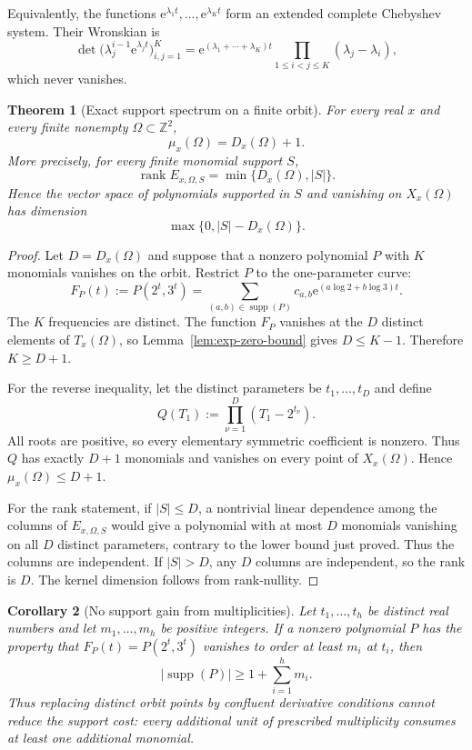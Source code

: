 \documentclass[11pt,oneside]{article}
\newtheorem{theorem}{Theorem}[section]
\newtheorem{corollary}[theorem]{Corollary}
\theoremstyle{definition}
\theoremstyle{remark}
\newcommand{\Z}{\mathbb Z}
\newcommand{\supp}{\operatorname{supp}}
\newcommand{\rank}{\operatorname{rank}}
\newcommand{\ee}{\mathrm e}
\begin{document}
Equivalently, the functions $\ee^{\lambda_1t},\dots,\ee^{\lambda_Kt}$ form an extended
complete Chebyshev system.  Their Wronskian is
\[
  \det\bigl(\lambda_j^{i-1}\ee^{\lambda_jt}\bigr)_{i,j=1}^K
  =\ee^{(\lambda_1+\cdots+\lambda_K)t}
    \prod_{1\le i<j\le K}(\lambda_j-\lambda_i),
\]
which never vanishes.

\begin{theorem}[Exact support spectrum on a finite orbit]
\label{thm:exact-support-general}
For every real $x$ and every finite nonempty $\Omega\subset\Z^2$,
\[
  \boxed{\ \mu_x(\Omega)=D_x(\Omega)+1.\ }
\]
More precisely, for every finite monomial support $S$,
\[
  \rank E_{x,\Omega,S}=\min\{D_x(\Omega),|S|\}.
\]
Hence the vector space of polynomials supported in $S$ and vanishing on
$X_x(\Omega)$ has dimension
\[
  \max\{0,|S|-D_x(\Omega)\}.
\]
\end{theorem}

\begin{proof}
Let $D=D_x(\Omega)$ and suppose that a nonzero polynomial $P$ with $K$ monomials vanishes on
the orbit.  Restrict $P$ to the one-parameter curve:
\[
  F_P(t):=P(2^t,3^t)
  =\sum_{(a,b)\in\supp(P)}c_{a,b}
       \ee^{(a\log2+b\log3)t}.
\]
The $K$ frequencies are distinct.  The function $F_P$ vanishes at the $D$ distinct elements
of $T_x(\Omega)$, so Lemma~\ref{lem:exp-zero-bound} gives $D\le K-1$.  Therefore
$K\ge D+1$.

For the reverse inequality, let the distinct parameters be $t_1,\dots,t_D$ and define
\[
  Q(T_1):=\prod_{\nu=1}^D(T_1-2^{t_\nu}).
\]
All roots are positive, so every elementary symmetric coefficient is nonzero.  Thus $Q$ has
exactly $D+1$ monomials and vanishes on every point of $X_x(\Omega)$.  Hence
$\mu_x(\Omega)\le D+1$.

For the rank statement, if $|S|\le D$, a nontrivial linear dependence among the columns of
$E_{x,\Omega,S}$ would give a polynomial with at most $D$ monomials vanishing on all $D$
distinct parameters, contrary to the lower bound just proved.  Thus the columns are
independent.  If $|S|>D$, any $D$ columns are independent, so the rank is $D$.  The kernel
dimension follows from rank-nullity.
\end{proof}

\begin{corollary}[No support gain from multiplicities]
\label{cor:confluent-support}
Let $t_1,\dots,t_h$ be distinct real numbers and let $m_1,\dots,m_h$ be positive integers.
If a nonzero polynomial $P$ has the property that $F_P(t)=P(2^t,3^t)$ vanishes to order at
least $m_i$ at $t_i$, then
\[
  |\supp(P)|\ge 1+\sum_{i=1}^h m_i.
\]
Thus replacing distinct orbit points by confluent derivative conditions cannot reduce the
support cost: every additional unit of prescribed multiplicity consumes at least one
additional monomial.
\end{corollary}
\end{document}
